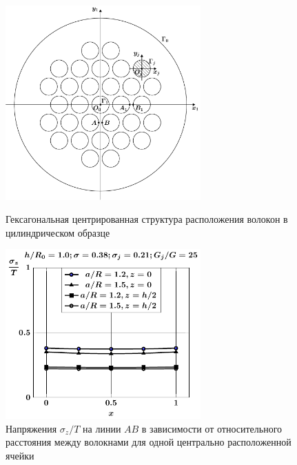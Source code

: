 \begin{russian}
\begin{figure}[h!]
\centering\footnotesize
\parbox[b]{7.5cm}{\centering\includegraphics[width=7.5cm]{inc-31.pdf}
\caption{Гексагональная центрированная структура расположения волокон в цилиндрическом образце
\label{f:7:147}}}\hfil\hfil
\parbox[b]{7.5cm}{\centering\includegraphics[width=7.5cm]{inc7-a-sig_z.pdf}
\caption{Напряжения $\sigma_z/T$ на линии $AB$ в зависимости от относительного расстояния между волокнами для одной центрально расположенной ячейки
\label{f:7:148}}}
\end{figure}


\end{russian}
